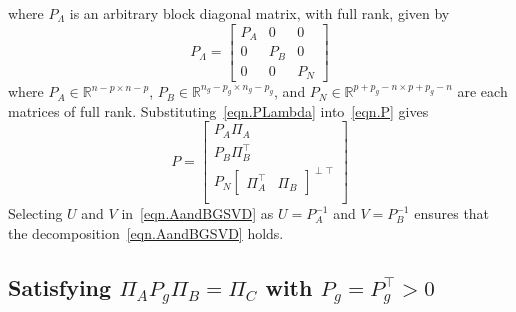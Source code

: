 \documentclass[journal]{IEEEtran}
\theoremstyle{innercustomthm}
\begin{document}
  where $P_{\Lambda}$ is an arbitrary block diagonal matrix, with full rank, given by
  \begin{equation}
    \label{eqn.PLambda}
    P_{\Lambda} =
    \begin{bmatrix}
      P_{A} & 0 & 0 \\
      0 & P_{B} & 0 \\
      0 & 0 & P_{N}
    \end{bmatrix}
  \end{equation}
  where $P_{A}\in\mathbb{R}^{n-p\times n-p}$, $P_{B}\in\mathbb{R}^{n_{g}-p_{g}\times n_{g}-p_{g}}$, and $P_{N}\in\mathbb{R}^{p+p_{g}-n \times p+p_{g}-n}$ are each matrices of full rank.
  Substituting\ \eqref{eqn.PLambda} into\ \eqref{eqn.P} gives
  \begin{equation}
    \label{eqn.PP}
    P
    =
    \begin{bmatrix}
      P_{A}\Pi_{A} \\
      P_{B}\Pi_{B}^{\top} \\
      P_{N}
      \begin{bmatrix}
        \Pi_{A}^{\top} & \Pi_{B}
      \end{bmatrix}^{\perp\top} \\
    \end{bmatrix}
  \end{equation}
  Selecting $U$ and $V$ in\ \eqref{eqn.AandBGSVD} as $U=P_{A}^{-1}$ and $V=P_{B}^{-1}$ ensures that the decomposition\ \eqref{eqn.AandBGSVD} holds.

  \subsection{Satisfying \texorpdfstring{$\Pi_{A}P_{g}\Pi_{B}=\Pi_{C}$}{piAPgpiB=piC} with \texorpdfstring{$P_{g}=P_{g}^{\top}>0$}{Pg=PgT}}
\end{document}
